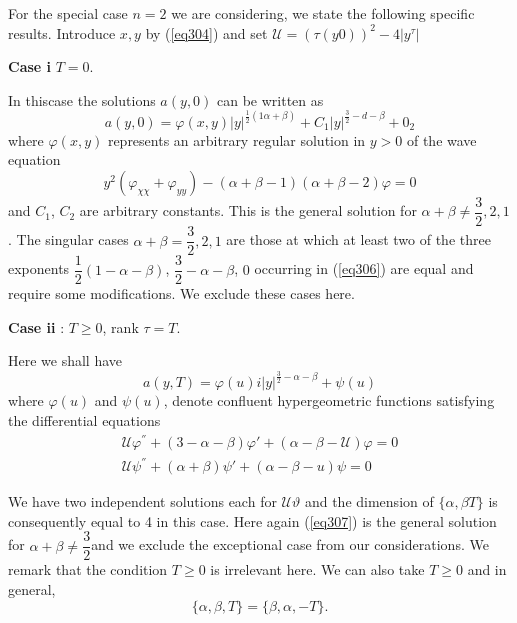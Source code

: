 For the special case $n=2$ we are considering, we state the following
specific results. Introduce $x,y$ by (\ref{eq304}) and set
$\mathcal{U} = ( \tau (y 0))^2 - 4 |y^\tau|$ 

\textbf{Case i}
$T = 0$.

In this\pageoriginale case the solutions $a(y, 0)$ can be written as   
\begin{equation*}
a (y, 0) = \varphi (x, y)|y|^{\frac{1}{2}(1 \alpha + \beta)}
+ C_1 |y|^{\frac{3}{2} - d - \beta} + 0_2 \tag{306}\label{eq306} 
\end{equation*}
where $\varphi(x, y)$ represents an arbitrary regular solution in $y >
0$ of the wave equation 
$$
y^2 (\varphi_{\chi \chi} + \varphi_{y y}) -(\alpha + \beta - 1)
(\alpha + \beta - 2) \varphi = 0 
$$
and $C_1$, $C_2$ are arbitrary constants. This is the general solution
for $\alpha + \beta \neq \dfrac{3}{2}, 2, 1$. The singular cases
$\alpha + \beta = \dfrac{3}{2}, 2,1$ are those at which at least two
of the three exponents $\dfrac{1}{2} (1- \alpha - \beta)$, $\dfrac{3}{2}
- \alpha - \beta$, $0$ occurring in (\ref{eq306}) are equal and require some
modifications. We exclude these cases here. 

\noindent
\textbf{Case ii} : $T \ge 0$, rank $\tau = T$. 

Here we shall have
\begin{equation*}
a (y, T) = \varphi (u) i |y|^{\frac{3}{2} - \alpha - \beta}
+ \psi (u) \tag{307}\label{eq307}
\end{equation*}
where $\varphi(u)$ and $\psi (u)$, denote confluent hypergeometric
functions satisfying the differential equations 
\begin{gather*}
\mathcal{U} \varphi^{''} + (3 - \alpha - \beta) \varphi' + (\alpha -
\beta -\mathcal{U} ) \varphi = 0\\ 
\mathcal{U} \psi^{''} + (\alpha + \beta) \psi' + (\alpha - \beta - u)
\psi = 0 
\end{gather*}

We have two independent solutions each for $\mathcal{U} \vartheta$ and
the dimension of $\{\alpha, \beta T \}$ is consequently equal to 4
in this case. Here again (\ref{eq307}) is the general solution for $\alpha +
\beta \neq \dfrac{3}{2}$\pageoriginale and we exclude the exceptional
case from our considerations. We remark that the condition $T \ge 0$
is irrelevant here. We can also take $T \ge 0$ and in general,  
$$
\{ \alpha, \beta ,T \} = \{ \beta, \alpha, -T \}.
$$



